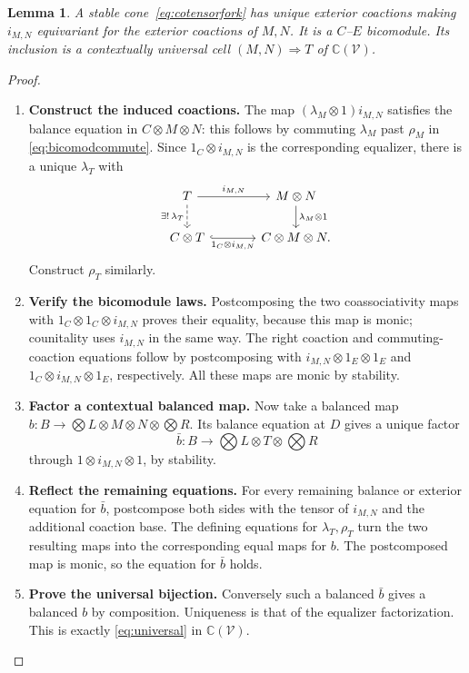 \documentclass[11pt,reqno]{amsart}
\theoremstyle{plain}
\newtheorem{lemma}[theorem]{Lemma}
\theoremstyle{definition}
\theoremstyle{remark}
\numberwithin{equation}{section}
\newcommand{\V}{\mathcal V}
\newcommand{\Ccal}{\mathbb C}
\newcommand{\cell}{\mathrel{\Longrightarrow}}
\begin{document}
\begin{lemma}\label{lem:cotensorstructure}
A stable cone~\eqref{eq:cotensorfork} has unique exterior coactions
making $i_{M,N}$ equivariant for the exterior coactions of $M,N$.
It is a $C$--$E$ bicomodule. Its inclusion is a contextually universal
cell $(M,N)\cell T$ of $\Ccal(\V)$.
\end{lemma}
\begin{proof}\leavevmode
\begin{enumerate}
\item \textbf{Construct the induced coactions.} The map $(\lambda_M\otimes1)i_{M,N}$ satisfies the balance equation
in $C\otimes M\otimes N$: this follows by commuting $\lambda_M$
past $\rho_M$ in \cref{eq:bicomodcommute}. Since
$1_C\otimes i_{M,N}$ is the corresponding equalizer, there is a
unique $\lambda_T$ with
\[
\begin{tikzcd}[column sep=3.6em]
T \arrow[r,"i_{M,N}"] \arrow[d,dashed,"\exists!\,\lambda_T"'] &
M\otimes N \arrow[d,"\lambda_M\otimes1"]\\
C\otimes T \arrow[r,hook,"1_C\otimes i_{M,N}"'] & C\otimes M\otimes N.
\end{tikzcd}
\]
Construct $\rho_T$ similarly.

\item \textbf{Verify the bicomodule laws.} Postcomposing the two coassociativity
maps with $1_C\otimes1_C\otimes i_{M,N}$ proves their equality,
because this map is monic; counitality uses $i_{M,N}$ in the same
way. The right coaction and commuting-coaction equations follow by
postcomposing with $i_{M,N}\otimes1_E\otimes1_E$ and
$1_C\otimes i_{M,N}\otimes1_E$, respectively. All these maps are
monic by stability.

\item \textbf{Factor a contextual balanced map.} Now take a balanced map
$b:B\to\bigotimes L\otimes M\otimes N\otimes\bigotimes R$.
Its balance equation at $D$ gives a unique factor
\[
 \bar b:B\longrightarrow\bigotimes L\otimes T\otimes\bigotimes R
\]
through $1\otimes i_{M,N}\otimes1$, by stability.

\item \textbf{Reflect the remaining equations.} For every remaining
balance or exterior equation for $\bar b$, postcompose both sides
with the tensor of $i_{M,N}$ and the additional coaction base. The
defining equations for $\lambda_T,\rho_T$ turn the two resulting
maps into the corresponding equal maps for $b$. The postcomposed map
is monic, so the equation for $\bar b$ holds.

\item \textbf{Prove the universal bijection.} Conversely such a
balanced $\bar b$ gives a balanced $b$ by composition. Uniqueness
is that of the equalizer factorization. This is exactly
\cref{eq:universal} in $\Ccal(\V)$.\qedhere
\end{enumerate}
\end{proof}
\end{document}
